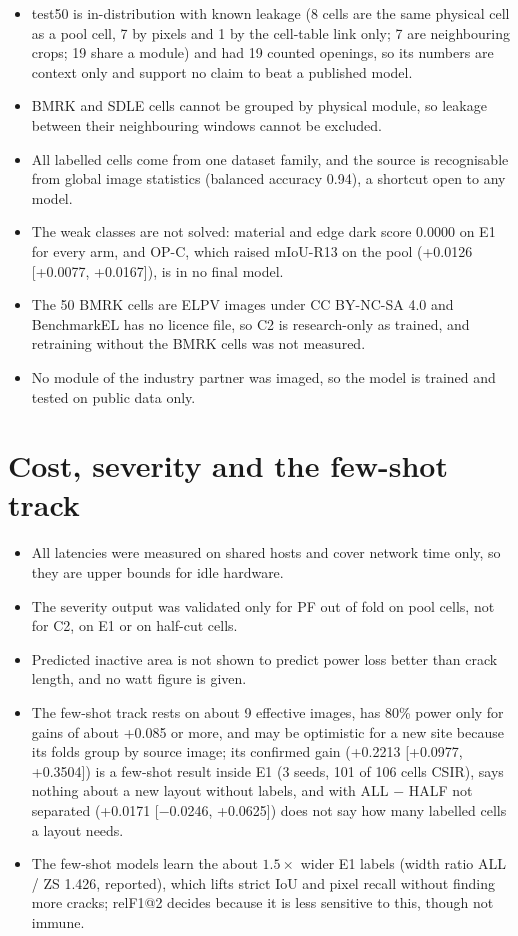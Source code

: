 \begin{itemize}
  \item test50 is in-distribution with known leakage (8 cells are the same physical cell as a pool cell, 7 by pixels and 1 by the
  cell-table link only; 7 are neighbouring crops; 19 share a module) and had 19 counted openings, so its numbers are context only
  and support no claim to beat a published model.
  \item BMRK and SDLE cells cannot be grouped by physical module, so leakage between their neighbouring windows cannot be excluded.
  \item All labelled cells come from one dataset family, and the source is recognisable from global image statistics (balanced
  accuracy 0.94), a shortcut open to any model.
  \item The weak classes are not solved: material and edge dark score 0.0000 on E1 for every arm, and OP-C, which raised mIoU-R13
  on the pool (+0.0126 [+0.0077, +0.0167]), is in no final model.
  \item The 50 BMRK cells are ELPV images under CC BY-NC-SA 4.0 and BenchmarkEL has no licence file, so C2 is research-only as
  trained, and retraining without the BMRK cells was not measured.
  \item No module of the industry partner was imaged, so the model is trained and tested on public data only.
\end{itemize}

\section{Cost, severity and the few-shot track}\label{sec:lim-other}

\begin{itemize}
  \item All latencies were measured on shared hosts and cover network time only, so they are upper bounds for idle hardware.
  \item The severity output was validated only for PF out of fold on pool cells, not for C2, on E1 or on half-cut cells.
  \item Predicted inactive area is not shown to predict power loss better than crack length, and no watt figure is given.
  \item The few-shot track rests on about 9 effective images, has 80\% power only for gains of about +0.085 or more, and may be
  optimistic for a new site because its folds group by source image; its confirmed gain (+0.2213 [+0.0977, +0.3504]) is a
  few-shot result inside E1 (3 seeds, 101 of 106 cells CSIR), says nothing about a new layout without labels, and with ALL $-$ HALF
  not separated (+0.0171 [$-$0.0246, +0.0625]) does not say how many labelled cells a layout needs.
  \item The few-shot models learn the about $1.5\times$ wider E1 labels (width ratio ALL / ZS 1.426, reported), which lifts strict
  IoU and pixel recall without finding more cracks; relF1@2 decides because it is less sensitive to this, though not immune.
\end{itemize}
